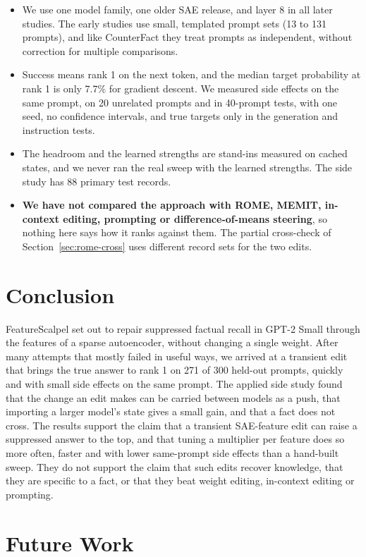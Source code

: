 \begin{itemize}
  \item We use one model family, one older SAE release, and layer 8 in all later studies. The early studies use small, templated prompt sets (13 to 131 prompts), and like CounterFact they treat prompts as independent, without correction for multiple comparisons.
  \item Success means rank 1 on the next token, and the median target probability at rank 1 is only 7.7\% for gradient descent. We measured side effects on the same prompt, on 20 unrelated prompts and in 40-prompt tests, with one seed, no confidence intervals, and true targets only in the generation and instruction tests.
  \item The headroom and the learned strengths are stand-ins measured on cached states, and we never ran the real sweep with the learned strengths. The side study has 88 primary test records.
  \item \textbf{We have not compared the approach with ROME, MEMIT, in-context editing, prompting or difference-of-means steering}, so nothing here says how it ranks against them. The partial cross-check of Section~\ref{sec:rome-cross} uses different record sets for the two edits.
\end{itemize}

\section{Conclusion}

FeatureScalpel set out to repair suppressed factual recall in GPT-2 Small through the features of a sparse autoencoder, without changing a single weight. After many attempts that mostly failed in useful ways, we arrived at a transient edit that brings the true answer to rank 1 on 271 of 300 held-out prompts, quickly and with small side effects on the same prompt. The applied side study found that the change an edit makes can be carried between models as a push, that importing a larger model's state gives a small gain, and that a fact does not cross. The results support the claim that a transient SAE-feature edit can raise a suppressed answer to the top, and that tuning a multiplier per feature does so more often, faster and with lower same-prompt side effects than a hand-built sweep. They do not support the claim that such edits recover knowledge, that they are specific to a fact, or that they beat weight editing, in-context editing or prompting.

\section{Future Work}

